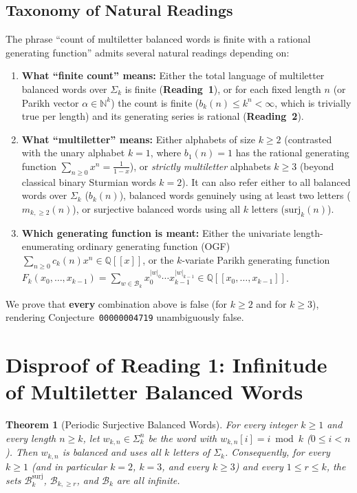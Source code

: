 \documentclass[11pt,a4paper]{article}
\newtheorem{theorem}{Theorem}[section]
\theoremstyle{definition}
\newcommand{\N}{\mathbb{N}}
\newcommand{\Q}{\mathbb{Q}}
\newcommand{\surj}{\mathrm{surj}}
\begin{document}
\subsection{Taxonomy of Natural Readings}
The phrase ``count of multiletter balanced words is finite with a rational generating function'' admits several natural readings depending on:
\begin{enumerate}
  \item \textbf{What ``finite count'' means:} Either the total language of multiletter balanced words over $\Sigma_k$ is finite (\textbf{Reading~1}), or for each fixed length $n$ (or Parikh vector $\alpha \in \N^k$) the count is finite ($b_k(n) \le k^n < \infty$, which is trivially true per length) and its generating series is rational (\textbf{Reading~2}).
  \item \textbf{What ``multiletter'' means:} Either alphabets of size $k \ge 2$ (contrasted with the unary alphabet $k = 1$, where $b_1(n) = 1$ has the rational generating function $\sum_{n \ge 0} x^n = \frac{1}{1-x}$), or \emph{strictly multiletter} alphabets $k \ge 3$ (beyond classical binary Sturmian words $k = 2$). It can also refer either to all balanced words over $\Sigma_k$ ($b_k(n)$), balanced words genuinely using at least two letters ($m_{k,\ge 2}(n)$), or surjective balanced words using all $k$ letters ($\surj_k(n)$).
  \item \textbf{Which generating function is meant:} Either the univariate length-enumerating ordinary generating function (OGF) $\sum_{n \ge 0} c_k(n)x^n \in \Q[[x]]$, or the $k$-variate Parikh generating function $F_k(x_0,\dots,x_{k-1}) = \sum_{w \in \mathcal{B}_k} x_0^{|w|_0}\cdots x_{k-1}^{|w|_{k-1}} \in \Q[[x_0,\dots,x_{k-1}]]$.
\end{enumerate}

We prove that \textbf{every} combination above is false (for $k \ge 2$ and for $k \ge 3$), rendering Conjecture~\texttt{00000004719} unambiguously false.

\section{Disproof of Reading 1: Infinitude of Multiletter Balanced Words}

\begin{theorem}[Periodic Surjective Balanced Words]
\label{thm:periodic}
For every integer $k \ge 1$ and every length $n \ge k$, let $w_{k,n} \in \Sigma_k^n$ be the word with $w_{k,n}[i] = i \bmod k$ ($0 \le i < n$). Then $w_{k,n}$ is balanced and uses all $k$ letters of $\Sigma_k$. Consequently, for every $k \ge 1$ (and in particular $k = 2$, $k = 3$, and every $k \ge 3$) and every $1 \le r \le k$, the sets $\mathcal{B}_k^{\surj}$, $\mathcal{B}_{k,\ge r}$, and $\mathcal{B}_k$ are all infinite.
\end{theorem}
\end{document}
